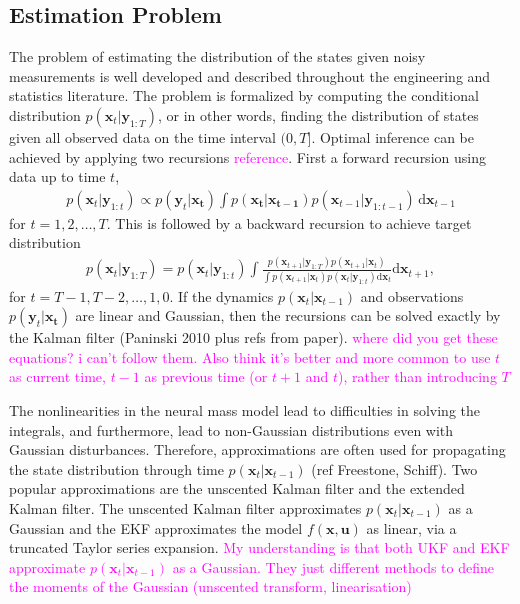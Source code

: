 \documentclass{article}
\newcommand{\unit}[1]{\textcolor{magenta}{#1}}
\begin{document}
\subsection{Estimation Problem}
The problem of estimating the distribution of the states given noisy measurements is well developed and described throughout the engineering and statistics literature. The problem is formalized by computing the conditional distribution $p\left(\mathbf{x}_t | \mathbf{y}_{1:T}\right)$, or in other words, finding the distribution of states given all observed data on the time interval $(0, T]$. Optimal inference can be achieved by applying two recursions \unit{reference}. First a forward recursion using data up to time $t$,
\begin{align}
	p\left(\mathbf{x}_t | \mathbf{y}_{1:t}\right) \propto p(\mathbf{y}_t|\mathbf{x_t})\int p(\mathbf{x_t}|\mathbf{x_{t-1}})p(\mathbf{x}_{t-1}|\mathbf{y}_{1:t-1}) \, \mathrm{d}\mathbf{x}_{t-1}
\end{align}
for $t = 1,2,\hdots,T$. This is followed by a backward recursion to achieve target distribution
\begin{align}
	p\left(\mathbf{x}_t | \mathbf{y}_{1:T}\right) = p\left(\mathbf{x}_t | \mathbf{y}_{1:t}\right) \int \frac{p\left(\mathbf{x}_{t+1} | \mathbf{y}_{1:T}\right) p\left(\mathbf{x}_{t+1} | \mathbf{x}_{t}\right) }{\int p\left(\mathbf{x}_{t+1} | \mathbf{x}_{t}\right) p\left(\mathbf{x}_{t} | \mathbf{y}_{1:t}\right) \mathrm{d}\mathbf{x}_{t} } \mathrm{d}\mathbf{x}_{t+1},
\end{align}
for $t = T-1,T-2,\hdots,1,0$. If the dynamics $p(\mathbf{x}_t | \mathbf{x}_{t-1})$ and observations $p(\mathbf{y}_t| \mathbf{x_t})$ are linear and Gaussian, then the recursions can be solved exactly by the Kalman filter (Paninski 2010 plus refs from paper). 
\unit{where did you get these equations? i can't follow them. Also think it's better and more common to use $t$ as current time, $t-1$ as previous time (or $t+1$ and $t$), rather than introducing $T$}

The nonlinearities in the neural mass model lead to difficulties in solving the integrals, and furthermore, lead to non-Gaussian distributions even with Gaussian disturbances. Therefore, approximations are often used for propagating the state distribution through time $p(\mathbf{x}_t | \mathbf{x}_{t-1})$ (ref Freestone, Schiff). Two popular approximations are the unscented Kalman filter and the extended Kalman filter. The unscented Kalman filter approximates $p(\mathbf{x}_t | \mathbf{x}_{t-1})$ as a Gaussian and the EKF approximates the model $f(\mathbf{x},\mathbf{u})$ as linear, via a truncated Taylor series expansion. 
\unit{My understanding is that both UKF and EKF approximate $p(\mathbf{x}_t | \mathbf{x}_{t-1})$ as a Gaussian. They just different methods to define the moments of the Gaussian (unscented transform, linearisation)}
\end{document}
